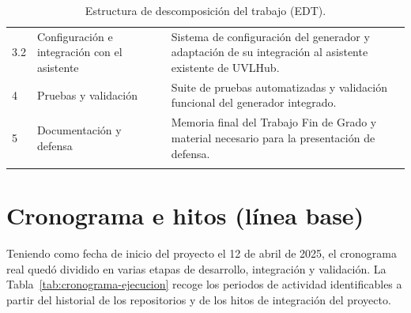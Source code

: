 \begin{longtable}{@{}P{1cm} P{4.5cm} P{8.8cm}@{}}
  3.2 & Configuración e integración con el asistente &
  Sistema de configuración del generador y adaptación de su integración
  al asistente existente de UVLHub. \\[0.3em]

  4 & Pruebas y validación &
  Suite de pruebas automatizadas y validación funcional del generador integrado. \\[0.3em]

  5 & Documentación y defensa &
  Memoria final del Trabajo Fin de Grado y material necesario para la presentación de defensa. \\

  \bottomrule

  \caption{Estructura de descomposición del trabajo (EDT).}
  \label{tab:edt}
\end{longtable}

\section{Cronograma e hitos (línea base)}
\label{sec:fases}


Teniendo como fecha de inicio del proyecto el 12 de abril de 2025, el
cronograma real quedó dividido en varias etapas de desarrollo, integración y
validación. La Tabla~\ref{tab:cronograma-ejecucion} recoge los periodos de
actividad identificables a partir del historial de los repositorios y de los
hitos de integración del proyecto.

